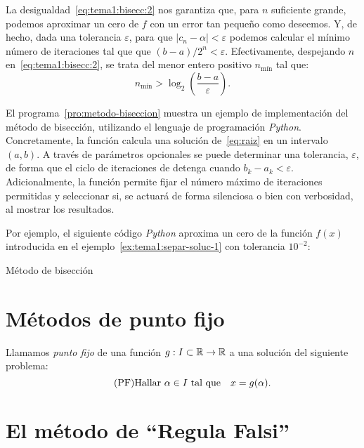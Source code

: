 \begin{remark}
  \label{rk:tema1:bisecc:iteraciones}
  La desigualdad~\eqref{eq:tema1:bisecc:2} nos garantiza que, para $n$
  suficiente grande, podemos aproximar un cero de $f$ con un error tan
  pequeño como deseemos. Y, de hecho, dada una tolerancia $\varepsilon$,
  para que $|c_n-\alpha|<\varepsilon$ podemos calcular el mínimo número
  de iteraciones tal que que $(b-a)/2^n < \varepsilon$. Efectivamente,
  despejando $n$ en~\eqref{eq:tema1:bisecc:2}, se trata del menor
  entero positivo $n_{\text{mín}}$ tal que:
  \begin{equation*}
    n_{\text{mín}}>\log_2\left(\frac{b-a}{\varepsilon}\right).
  \end{equation*}
\end{remark}


\begin{test}
  El programa~\ref{pro:metodo-biseccion} muestra un ejemplo de
  implementación del método de bisección, utilizando el lenguaje de
  programación \textit{Python}. Concretamente, la función
   calcula una solución
  de~\eqref{eq:raiz} en un intervalo $(a,b)$. A través de parámetros
  opcionales se puede determinar una tolerancia, $\varepsilon$, de
  forma que el ciclo de iteraciones de detenga cuando
  $b_k-a_k<\varepsilon$. Adicionalmente, la función permite fijar el
  número máximo de iteraciones permitidas y seleccionar si, se actuará
  de forma silenciosa o bien con verbosidad, al mostrar los resultados.

  Por ejemplo, el siguiente código \textit{Python} aproxima un cero de
  la función $f(x)$ introducida en el
  ejemplo~\ref{ex:tema1:separ-soluc-1} 
  con tolerancia $10^{-2}$:
  \begin{pythonoutput}
  \end{pythonoutput}
\end{test}


\begin{program}
  \label{pro:metodo-biseccion}
  \caption{Método de bisección}
\end{program}


\section{Métodos de punto fijo}
\label{sec:metodos-de-punto-fijo}

Llamamos \textit{punto fijo} de una función
$g:I\subset\operatorname{{\mathbb R}}\to\operatorname{{\mathbb R}}$ a una solución del siguiente  problema:
\begin{equation}
\label{eq:punto-fijo}
\tag{PF}
\text{Hallar $\alpha\in I$ tal que} \quad x=g(\alpha).
\end{equation}


\section{El método de ``Regula Falsi''}
\label{sec:regula-falsi}

